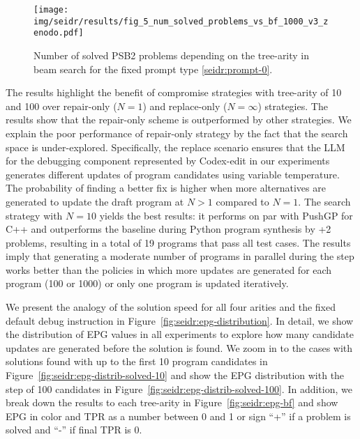 \begin{figure}[t]
  \centering
  \texttt{[image: img/seidr/results/fig\_5\_num\_solved\_problems\_vs\_bf\_1000\_v3\_zenodo.pdf]}
  \caption{Number of solved PSB2 problems depending on the tree-arity in beam search for the fixed prompt type \ref{seidr:prompt-0}.}
  \label{fig:seidr:solved-vs-bf}
  \vspace*{-2ex}
\end{figure}

The results highlight the benefit of compromise strategies with tree-arity of 10 and 100 over repair-only ($N=1$) and replace-only ($N=\infty$) strategies. 
The results show that the repair-only scheme is outperformed by other strategies. 
We explain the poor performance of repair-only strategy by the fact that the search space is under-explored. 
Specifically, the replace scenario ensures that the LLM for the debugging component represented by Codex-edit in our experiments generates different updates of program candidates using variable temperature.
The probability of finding a better fix is higher when more alternatives are generated to update the draft program at $N>1$ compared to $N=1$. 
The search strategy with $N=10$ yields the best results: it performs on par with PushGP for C++ and outperforms the baseline during Python program synthesis by +2 problems, resulting in a total of 19 programs that pass all test cases.
The results imply that generating a moderate number of programs in parallel during the \debug{} step works better than the policies in which more updates are generated for each program (100 or 1000) or only one program is updated iteratively.

We present the analogy of the solution speed for all four arities and the fixed default debug instruction in Figure~\ref{fig:seidr:epg-distribution}. 
In detail, we show the distribution of EPG values in all experiments to explore how many candidate updates are generated before the solution is found.
We zoom in to the cases with solutions found with up to the first 10 program candidates in Figure~\ref{fig:seidr:epg-distrib-solved-10} and show the EPG distribution with the step of 100 candidates in Figure~\ref{fig:seidr:epg-distrib-solved-100}. 
In addition, we break down the results to each tree-arity in Figure~\ref{fig:seidr:epg-bf} and show EPG in color and TPR as a number between 0 and 1 or sign ``+'' if a problem is solved and ``-'' if final TPR is 0. 


